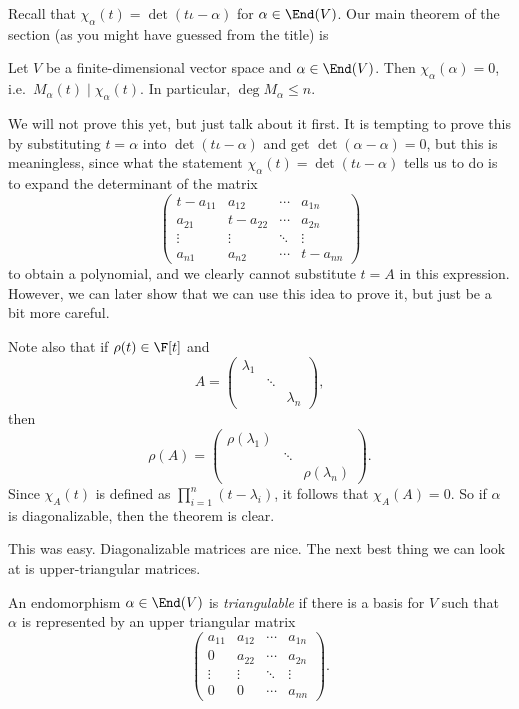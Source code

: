 \documentclass[a4paper]{article}
\begin{document}
Recall that $\chi_\alpha(t) = \det (t\iota - \alpha)$ for $\alpha \in \End(V)$. Our main theorem of the section (as you might have guessed from the title) is
\begin{thm}
  Let $V$ be a finite-dimensional vector space and $\alpha \in \End(V)$. Then $\chi_\alpha(\alpha) = 0$, i.e.\ $M_\alpha(t) \mid \chi_\alpha(t)$. In particular, $\deg M_\alpha \leq n$.
\end{thm}
We will not prove this yet, but just talk about it first. It is tempting to prove this by substituting $t = \alpha$ into $\det(t\iota - \alpha)$ and get $\det (\alpha - \alpha) = 0$, but this is meaningless, since what the statement $\chi_\alpha(t) = \det (t\iota - \alpha)$ tells us to do is to expand the determinant of the matrix
\[
  \begin{pmatrix}
    t - a_{11} & a_{12} & \cdots & a_{1n}\\
    a_{21} & t - a_{22} & \cdots & a_{2n}\\
    \vdots & \vdots & \ddots & \vdots\\
    a_{n1} & a_{n2} & \cdots & t - a_{nn}
  \end{pmatrix}
\]
to obtain a polynomial, and we clearly cannot substitute $t = A$ in this expression. However, we can later show that we can use this idea to prove it, but just be a bit more careful.

Note also that if $\rho(t) \in \F[t]$ and
\[
  A =
  \begin{pmatrix}
    \lambda_1 &\\
    & \ddots\\
    & & \lambda_n
  \end{pmatrix},
\]
then
\[
  \rho(A) =
  \begin{pmatrix}
    \rho(\lambda_1) &\\
    & \ddots\\
    & & \rho(\lambda_n)
  \end{pmatrix}.
\]
Since $\chi_A(t)$ is defined as $\prod_{i = 1}^n (t - \lambda_i)$, it follows that $\chi_A(A) = 0$. So if $\alpha$ is diagonalizable, then the theorem is clear.

This was easy. Diagonalizable matrices are nice. The next best thing we can look at is upper-triangular matrices.
\begin{defi}[Triangulable]
  An endomorphism $\alpha \in \End(V)$ is \emph{triangulable} if there is a basis for $V$ such that $\alpha$ is represented by an upper triangular matrix
  \[
    \begin{pmatrix}
      a_{11} & a_{12} & \cdots & a_{1n}\\
      0 & a_{22} & \cdots & a_{2n}\\
      \vdots & \vdots & \ddots & \vdots\\
      0 & 0 & \cdots & a_{nn}
    \end{pmatrix}.
  \]
\end{defi}
\end{document}
